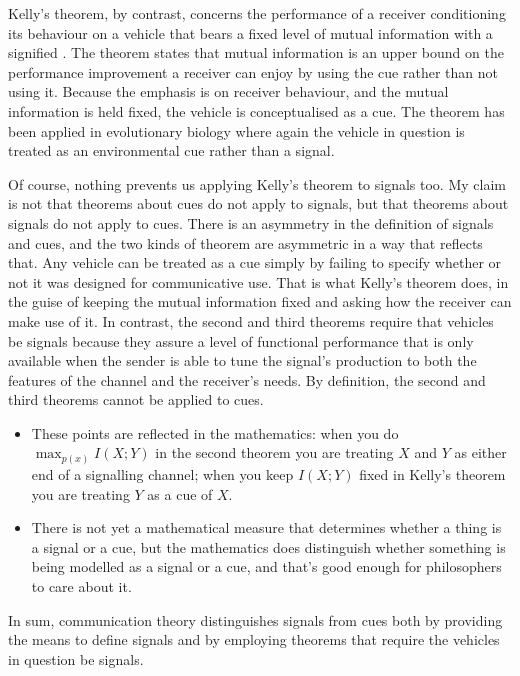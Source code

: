 Kelly's theorem, by contrast, concerns the performance of a receiver conditioning its behaviour on a vehicle that bears a fixed level of mutual information with a signified \citep{kelly1956new}.
The theorem states that mutual information is an upper bound on the performance improvement a receiver can enjoy by using the cue rather than not using it.
Because the emphasis is on receiver behaviour, and the mutual information is held fixed, the vehicle is conceptualised as a cue.
The theorem has been applied in evolutionary biology \citep{donaldson-matasci2010fitness} where again the vehicle in question is treated as an environmental cue rather than a signal.

Of course, nothing prevents us applying Kelly's theorem to signals too.
My claim is not that theorems about cues do not apply to signals, but that theorems about signals do not apply to cues.
There is an asymmetry in the definition of signals and cues, and the two kinds of theorem are asymmetric in a way that reflects that.
Any vehicle can be treated as a cue simply by failing to specify whether or not it was designed for communicative use.
That is what Kelly's theorem does, in the guise of keeping the mutual information fixed and asking how the receiver can make use of it.
In contrast, the second and third theorems require that vehicles be signals because they assure a level of functional performance that is only available when the sender is able to tune the signal's production to both the features of the channel and the receiver's needs.
By definition, the second and third theorems cannot be applied to cues.

\begin{itemize}
    \item These points are reflected in the mathematics: when you do $\max_{p(x)}I(X;Y)$ in the second theorem you are treating $X$ and $Y$ as either end of a signalling channel; when you keep $I(X;Y)$ fixed in Kelly's theorem you are treating $Y$ as a cue of $X$.
    \item There is not yet a mathematical measure that determines whether a thing is a signal or a cue, but the mathematics does distinguish whether something is being modelled as a signal or a cue, and that's good enough for philosophers to care about it.
\end{itemize}

In sum, communication theory distinguishes signals from cues both by providing the means to define signals and by employing theorems that require the vehicles in question be signals.

